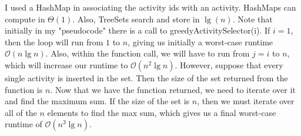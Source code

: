 \documentclass[20pt]{article} %
\begin{document}
I used a HashMap in associating the activity ids with an activity.  HashMaps can compute in $\Theta(1)$.  Also, TreeSets search and store in $\lg(n)$.  Note that initially in my "pseudocode" there is a call to greedyActivitySelector(i).  If $i = 1$, then the loop will run from $1$ to $n$, giving us initially a worst-case runtime $\mathcal{O}(n \lg n)$. Also, within the function call, we will have to run from $j = i$ to $n$, which will increase our runtime to $\mathcal{O}(n^{2} \lg n)$.  However, suppose that every single activity is inserted in the set.  Then the size of the set returned from the function is $n$.  Now that we have the function returned, we need to iterate over it and find the maximum sum.  If the size of the set is $n$, then we must iterate over all of the $n$ elements to find the max sum, which gives us a final worst-case runtime of $\mathcal{O}(n^{3} \lg n)$.
\end{document}
